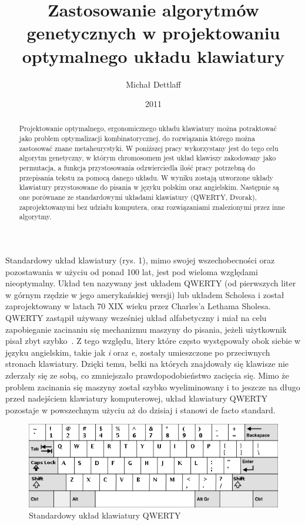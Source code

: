\documentclass{xmgr}
\author   {Michał Dettlaff}
\title    {Zastosowanie algorytmów genetycznych w projektowaniu optymalnego układu klawiatury}
\date     {2011}
\begin{document}
\begin{abstract}
  Projektowanie optymalnego, ergonomicznego układu klawiatury można potraktować jako problem optymalizacji kombinatorycznej, do rozwiązania którego można zastosować znane metaheurystyki. W poniższej pracy wykorzystany jest do tego celu algorytm genetyczny, w którym chromosomem jest układ klawiszy zakodowany jako permutacja, a funkcja przystosowania odzwierciedla ilość pracy potrzebną do przepisania tekstu za pomocą danego układu. W wyniku zostają utworzone układy klawiatury przystosowane do pisania w języku polskim oraz angielskim. Następnie są one porównane ze standardowymi układami klawiatury (QWERTY, Dvorak), zaprojektowanymi bez udziału komputera, oraz rozwiązaniami znalezionymi przez inne algorytmy.
\end{abstract}

\maketitle
%
\introduction

Standardowy układ klawiatury (rys. 1), mimo swojej wszechobecności oraz pozostawania w użyciu od ponad 100 lat, jest pod wieloma względami nieoptymalny. Układ ten nazywany jest układem QWERTY (od pierwszych liter w górnym rzędzie w jego amerykańskiej wersji) lub układem Scholesa i został zaprojektowany w latach 70 XIX wieku przez Charles'a Lethama Sholesa. QWERTY zastąpił używany wcześniej układ alfabetyczny i miał na celu zapobieganie zacinaniu się mechanizmu maszyny do pisania, jeżeli użytkownik pisał zbyt szybko~\cite{Norman:1988:DOET}. Z tego względu, litery które często występowały obok siebie w języku angielskim, takie jak \emph{i} oraz \emph{e}, zostały umieszczone po przeciwnych stronach klawiatury. Dzięki temu, belki na których znajdowały się klawisze nie zderzały się ze sobą, co zmniejszało prawdopodobieństwo zacięcia się. Mimo że problem zacinania się maszyny został szybko wyeliminowany i to jeszcze na długo przed nadejściem klawiatury komputerowej, układ klawiatury QWERTY pozostaje w powszechnym użyciu aż do dzisiaj i stanowi de facto standard.

\begin{figure}[!tbh]
\centering
\includegraphics[width=.8\hsize]{fig/qwerty}
\caption{Standardowy układ klawiatury QWERTY}
\end{figure}
\end{document}
